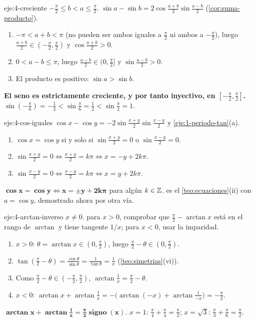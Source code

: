 \begin{solucion}{eje:4-creciente}
\datos $-\frac{\pi}{2}\le b<a\le\frac{\pi}{2}$.
\planteamiento $\sin a-\sin b=2\cos\frac{a+b}{2}\sin\frac{a-b}{2}$ (\cref{cor:suma-producto}).
\pasos
\begin{enumerate}[label=\arabic*.]
  \item $-\pi<a+b<\pi$ (no pueden ser ambos iguales a $\frac{\pi}{2}$ ni ambos a $-\frac{\pi}{2}$), luego $\frac{a+b}{2}\in(-\frac{\pi}{2},\frac{\pi}{2})$ y $\cos\frac{a+b}{2}>0$.
  \item $0<a-b\le\pi$, luego $\frac{a-b}{2}\in(0,\frac{\pi}{2}]$ y $\sin\frac{a-b}{2}>0$.
  \item El producto es positivo: $\sin a>\sin b$.
\end{enumerate}
\resultado \textbf{El seno es estrictamente creciente, y por tanto inyectivo, en $[-\frac{\pi}{2},\frac{\pi}{2}]$.}
\comprobacion $\sin(-\frac{\pi}{6})=-\frac12<\sin\frac{\pi}{6}=\frac12<\sin\frac{\pi}{2}=1$.
\end{solucion}

\begin{solucion}{eje:4-cos-iguales}
\planteamiento $\cos x-\cos y=-2\sin\frac{x+y}{2}\sin\frac{x-y}{2}$ y \cref{eje:1-periodo-tan}(a).
\pasos
\begin{enumerate}[label=\arabic*.]
  \item $\cos x=\cos y$ si y solo si $\sin\frac{x+y}{2}=0$ o $\sin\frac{x-y}{2}=0$.
  \item $\sin\frac{x+y}{2}=0\iff\frac{x+y}{2}=k\pi\iff x=-y+2k\pi$.
  \item $\sin\frac{x-y}{2}=0\iff\frac{x-y}{2}=k\pi\iff x=y+2k\pi$.
\end{enumerate}
\resultado $\mathbf{\cos x=\cos y\iff x=\pm y+2k\pi}$ para algún $k\in\mathbb{Z}$.
\comprobacion es el \cref{teo:ecuaciones}(ii) con $a=\cos y$, demostrado ahora por otra vía.
\end{solucion}

\begin{solucion}{eje:4-arctan-inverso}
\datos $x\ne0$.
\planteamiento para $x>0$, comprobar que $\frac{\pi}{2}-\arctan x$ está en el rango de $\arctan$ y tiene tangente $1/x$; para $x<0$, usar la imparidad.
\pasos
\begin{enumerate}[label=\arabic*.]
  \item $x>0$: $\theta=\arctan x\in(0,\frac{\pi}{2})$, luego $\frac{\pi}{2}-\theta\in(0,\frac{\pi}{2})$.
  \item $\tan(\frac{\pi}{2}-\theta)=\frac{\cos\theta}{\sin\theta}=\frac1{\tan\theta}=\frac1x$ (\cref{teo:simetrias}(vi)).
  \item Como $\frac{\pi}{2}-\theta\in(-\frac{\pi}{2},\frac{\pi}{2})$, $\arctan\frac1x=\frac{\pi}{2}-\theta$.
  \item $x<0$: $\arctan x+\arctan\frac1x=-\bigl(\arctan(-x)+\arctan\frac{1}{-x}\bigr)=-\frac{\pi}{2}$.
\end{enumerate}
\resultado $\mathbf{\arctan x+\arctan\frac1x=\frac{\pi}{2}\operatorname{signo}(x)}$.
\comprobacion $x=1$: $\frac{\pi}{4}+\frac{\pi}{4}=\frac{\pi}{2}$; $x=\sqrt3$: $\frac{\pi}{3}+\frac{\pi}{6}=\frac{\pi}{2}$.
\end{solucion}

